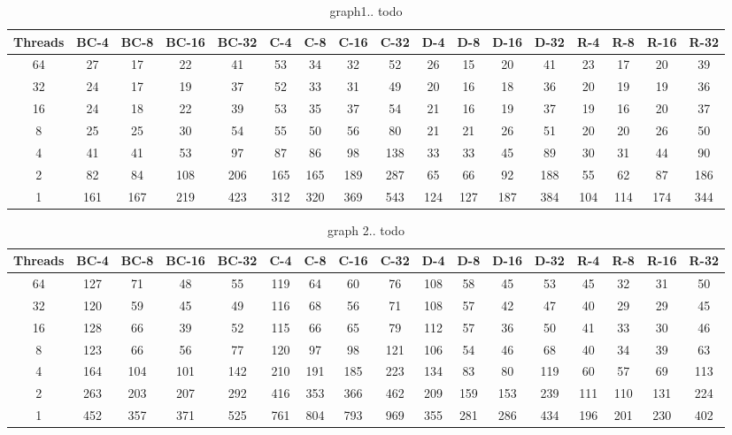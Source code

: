 \onecolumngrid
\begin{table}
\label{tab:graph1}
\caption{graph1.. todo}
{\small
\begin{tabular}{||c||c|c|c|c||c|c|c|c||c|c|c|c||c|c|c|c|}
\hline
\textbf{Threads}	&\cellcolor{black!10}BC-4&	\cellcolor{black!10}BC-8	&\cellcolor{black!10}BC-16	&\cellcolor{black!10}BC-32&	\cellcolor{black!10}C-4	&\cellcolor{black!10}C-8&	\cellcolor{black!10}C-16&	\cellcolor{black!10}C-32&	\cellcolor{black!10}D-4&	\cellcolor{black!10}D-8	&\cellcolor{black!10}D-16&\cellcolor{black!10}	D-32&	\cellcolor{black!10}R-4	&\cellcolor{black!10}R-8&	\cellcolor{black!10}R-16&	\cellcolor{black!10}R-32 \\ \hline \hline
64&		27	&17	&22	&41	&53	&34	&32	&52	&26	&15	&20	&41	&23	&17	&20	&39			\\ \hline					
32&		24	&17	&19	&37	&52	&33	&31	&49	&20	&16	&18	&36	&20	&19	&19	&36	\\ \hline
16&		24	&18	&22	&39	&53	&35	&37	&54	&21	&16	&19	&37	&19	&16	&20&37	\\ \hline
8	&	25	&25	&30	&54	&55	&50	&56	&80	&21	&21	&26	&51	&20	&20	&26	&50	\\ \hline
4	&	41	&41	&53	&97	&87	&86	&98	&138	&33	&33	&45	&89	&30	&31	&44	&90	\\ \hline
2&		82	&84	&108	&206	&165	&165	&189	&287	&65	&66	&92	&188	&55	&62	&87	&186	\\ \hline
1&		161	&167	&219	&423	&312	&320	&369	&543	&124	&127	&187	&384	&104	&114	&174	&344	\\ \hline
\end{tabular}
}
\end{table}
%
\begin{table}
\label{tab:graph2}
\caption{graph 2.. todo}
{\small
\begin{tabular}{||c||c|c|c|c||c|c|c|c||c|c|c|c||c|c|c|c|}
\hline
\textbf{Threads}	&\cellcolor{black!10}BC-4&	\cellcolor{black!10}BC-8	&\cellcolor{black!10}BC-16	&\cellcolor{black!10}BC-32&	\cellcolor{black!10}C-4	&\cellcolor{black!10}C-8&	\cellcolor{black!10}C-16&	\cellcolor{black!10}C-32&	\cellcolor{black!10}D-4&	\cellcolor{black!10}D-8	&\cellcolor{black!10}D-16&\cellcolor{black!10}	D-32&	\cellcolor{black!10}R-4	&\cellcolor{black!10}R-8&	\cellcolor{black!10}R-16&	\cellcolor{black!10}R-32 \\ \hline \hline
64		&127	&71	&48	&55	&119	&64	&60	&76	&108	&58	&45	&53	&45	&32	&31	&50		 \\ \hline		
32		&120	&59	&45	&49	&116	&68	&56	&71	&108	&57	&42	&47	&40	&29	&29	&45		 \\ \hline			
16		&128	&66	&39	&52	&115	&66	&65	&79	&112	&57	&36	&50	&41	&33	&30	&46 \\ \hline				
8		&123	&66	&56	&77	&120	&97	&98	&121	&106	&54	&46	&68	&40	&34	&39	&63	 \\ \hline			
4		&164	&104	&101	&142	&210	&191	&185	&223	&134	&83	&80	&119	&60	&57	&69	&113	 \\ \hline			
2		&263	&203	&207	&292	&416	&353	&366	&462	&209	&159	&153	&239	&111	&110	&131	&224	 \\ \hline		
1		&452&357	&371	&525	&761	&804	&793	&969	&355	&281	&286	&434	&196	&201	&230	&402 \\ \hline		
\end{tabular}
}
\end{table}
